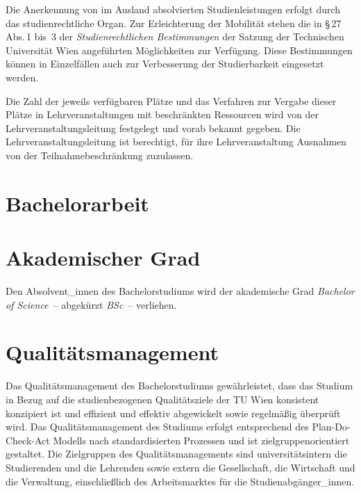Die Anerkennung von im Ausland absolvierten Studienleistungen
erfolgt durch das studienrechtliche Organ.
Zur Erleichterung der Mobilität stehen die in \S\,27 Abs.\,1 bis~3 der
\emph{Studienrechtlichen Bestimmungen} der Satzung der Technischen
Universität Wien angeführten Möglichkeiten zur Verfügung. Diese
Bestimmungen können in Einzelfällen auch zur Verbesserung der
Studierbarkeit eingesetzt werden.

%

Die Zahl der jeweils verfügbaren Plätze und das Verfahren zur Vergabe
dieser Plätze in Lehrveranstaltungen mit beschränkten Ressourcen wird
von der Lehrveranstaltungsleitung festgelegt und vorab bekannt gegeben.
Die Lehrveranstaltungsleitung ist berechtigt, für ihre Lehrveranstaltung
Ausnahmen von der Teilnahmebeschränkung zuzulassen.

%

\section{Bachelorarbeit}\label{sec:BA}

%

\section{Akademischer Grad}\label{sec:AG}

Den Absolvent\_innen %
des Bachelorstudiums
\emph{} wird der akademische Grad \emph{Bachelor of
  Science}~-- abgekürzt \emph{BSc}~-- verliehen.

\section{Qualitätsmanagement}\label{sec:IQ}

Das Qualitätsmanagement des Bachelorstudiums \emph{}
gewährleistet, dass das Studium in Bezug auf die studienbezogenen
Qualitätsziele der TU Wien konsistent konzipiert ist und effizient und
effektiv abgewickelt sowie regelmäßig überprüft wird. Das
Qualitätsmanagement des Studiums erfolgt entsprechend des
Plan-Do-Check-Act Modells nach standardisierten Prozessen und ist
zielgruppenorientiert gestaltet. Die Zielgruppen des
Qualitätsmanagements sind universitätsintern die Studierenden und die
Lehrenden sowie extern die Gesellschaft, die Wirtschaft und die
Verwaltung, einschließlich des Arbeitsmarktes für die
Studienabgänger\_innen.
\medskip

